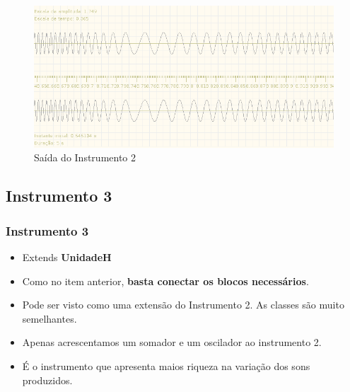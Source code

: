 \documentclass{beamer}
\begin{document}
\begin{frame}
 \begin{figure}
  \includegraphics[scale=0.4]{./images/ins2.png}
  \caption{Saída do Instrumento 2}
 \end{figure} 
\end{frame}

\subsection{Instrumento 3}
\begin{frame}
 \frametitle{Instrumento 3}
  \begin{itemize}
 \item Extends \textbf{UnidadeH}
 \item Como no item anterior, \textbf{basta conectar os blocos necessários}.
 \item Pode ser visto como uma extensão do Instrumento 2. As classes são muito semelhantes.
 \item Apenas acrescentamos um somador e um oscilador ao instrumento 2.
 \item É o instrumento que apresenta maios riqueza na variação dos sons produzidos.
 \end{itemize}
\end{frame}
\end{document}
